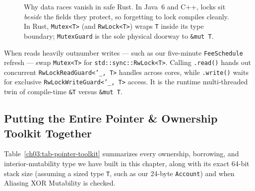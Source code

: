 \begin{figure}[H]
\caption{Why data races vanish in safe Rust. In Java~6 and C++, locks sit \emph{beside} the fields they protect, so forgetting to lock compiles cleanly. In Rust, \texttt{Mutex<T>} (and \texttt{RwLock<T>}) wraps \texttt{T} inside its type boundary; \texttt{MutexGuard} is the sole physical doorway to \texttt{\&mut T}.}
\label{ch03:fig-java-vs-rust-mutex}
\end{figure}

When reads heavily outnumber writes --- such as our five-minute \texttt{FeeSchedule} refresh --- swap \texttt{Mutex<T>} for \texttt{std::sync::RwLock<T>}. Calling \texttt{.read()} hands out concurrent \texttt{RwLockReadGuard<'\_, T>} handles across cores, while \texttt{.write()} waits for exclusive \texttt{RwLockWriteGuard<'\_, T>} access. It is the runtime multi-threaded twin of compile-time \texttt{\&T} versus \texttt{\&mut T}.

\subsection{Putting the Entire Pointer \& Ownership Toolkit Together}

Table~\ref{ch03:tab-pointer-toolkit} summarizes every ownership, borrowing, and interior-mutability type we have built in this chapter, along with its exact 64-bit stack size (assuming a sized type \texttt{T}, such as our 24-byte \texttt{Account}) and when Aliasing XOR Mutability is checked.

